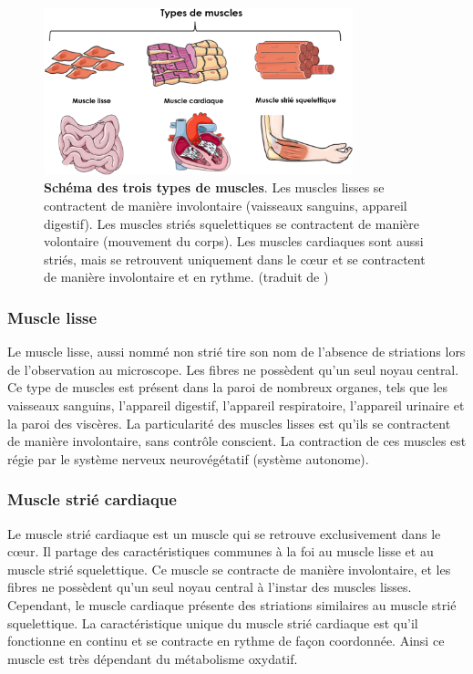 \begin{figure}[htbp]
 \centering
 \includegraphics[width=0.8\textwidth]{figures/muscle_type.png}
 \caption[Schéma des trois types de muscles]{\textbf{Schéma des trois types de muscles}. Les muscles lisses se contractent de manière involontaire (vaisseaux sanguins, appareil digestif). Les muscles striés squelettiques se contractent de manière volontaire (mouvement du corps). Les muscles cardiaques sont aussi striés, mais se retrouvent uniquement dans le cœur et se contractent de manière involontaire et en rythme. (traduit de \cite{gomez_oca_physiological_2021})}
 \label{fig:muscle-type}
\end{figure}

\subsubsection{Muscle lisse}
Le muscle lisse, aussi nommé non strié tire son nom de l'absence de striations lors de l'observation au microscope. Les fibres ne possèdent qu'un seul noyau central. Ce type de muscles est présent dans la paroi de nombreux organes, tels que les vaisseaux sanguins, l'appareil digestif, l'appareil respiratoire, l'appareil urinaire et la paroi des viscères. La particularité des muscles lisses est qu'ils se contractent de manière involontaire, sans contrôle conscient. La contraction de ces muscles est régie par le système nerveux neurovégétatif (système autonome).

\subsubsection{Muscle strié cardiaque}
Le muscle strié cardiaque est un muscle qui se retrouve exclusivement dans le cœur. Il partage des caractéristiques communes à la foi au muscle lisse et au muscle strié squelettique. Ce muscle se contracte de manière involontaire, et les fibres ne possèdent qu'un seul noyau central à l'instar des muscles lisses. Cependant, le muscle cardiaque présente des striations similaires au muscle strié squelettique. La caractéristique unique du muscle strié cardiaque est qu'il fonctionne en continu et se contracte en rythme de façon coordonnée. Ainsi ce muscle est très dépendant du métabolisme oxydatif.

